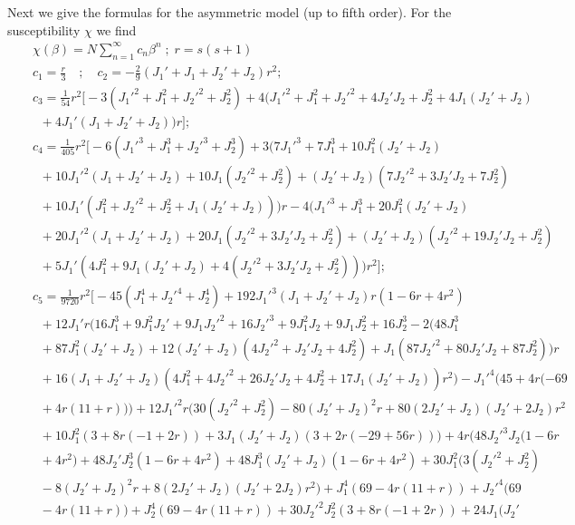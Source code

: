 \documentclass[aps,twocolumn,groupedaddress]{revtex4}
\begin{document}
\begin{widetext}
Next we give the formulas for the asymmetric model
(up to  fifth order).  For the susceptibility $\chi$ we find
\begin{eqnarray}
&& \chi(\beta)=N\sum_{n=1}^{\infty}c_n\beta^n \; ; \; r=s(s+1)\\
&&c_1=\frac{r}{3} \quad ; \quad c_2=-\frac{2}{9}(J_1'+J_1+J_2'+J_2)r^2;\nonumber\\
&&c_3=\frac{1}{54}r^2\Big[-3(J_1'^2+J_1^2+J_2'^2+J_2^2)+4(J_1'^2+J_1^2+J_2'^2+4J_2'J_2+J_2^2+4J_1(J_2'+J_2)\nonumber\\
&& \; \; +4J_1'(J_1+J_2'+J_2))r\Big];\nonumber\\
&&c_4=\frac{1}{405}r^2\Big[-6(J_1'^3+J_1^3+J_2'^3+J_2^3)+3(7J_1'^3+7J_1^3+10J_1^2(J_2'+J_2)\nonumber\\
&& \; \; +10J_1'^2(J_1+J_2'+J_2)+10J_1(J_2'^2+J_2^2)+(J_2'+J_2)(7J_2'^2+3J_2'J_2+7J_2^2)\nonumber\\
&& \; \; +10J_1'(J_1^2+J_2'^2+J_2^2+J_1(J_2'+J_2)))r-4(J_1'^3+J_1^3+20J_1^2(J_2'+J_2)\nonumber\\
&& \; \; +20J_1'^2(J_1+J_2'+J_2)+20J_1(J_2'^2+3J_2'J_2+J_2^2)+(J_2'+J_2)(J_2'^2+19J_2'J_2+J_2^2)\nonumber\\
&& \; \; +5J_1'(4J_1^2+9J_1(J_2'+J_2)+4(J_2'^2+3J_2'J_2+J_2^2)))r^2\Big];\nonumber\\
&&c_5=\frac{1}{9720}r^2\Big[-45(J_1^4+J_2'^4+J_2^4)+192J_1'^3(J_1+J_2'+J_2)r(1-6r+4r^2)\nonumber\\
&& \; \; +12J_1'r(16 J_1^3+9J_1^2J_2'+9J_1J_2'^2+16J_2'^3+9J_1^2J_2+9J_1J_2^2+16J_2^3-2(48J_1^3\nonumber\\
&& \; \; +87J_1^2(J_2'+J_2)+12(J_2'+J_2)(4J_2'^2+J_2'J_2+4J_2^2)+J_1(87J_2'^2+80J_2'J_2+87J_2^2))r\nonumber\\
&& \; \; +16(J_1+J_2'+J_2)(4J_1^2+4J_2'^2+26J_2'J_2+4J_2^2+17J_1(J_2'+J_2))r^2)-J_1'^4(45+4r(-69\nonumber\\
&& \; \; +4r(11+r)))+12J_1'^2r(30(J_2'^2+J_2^2)-80(J_2'+J_2)^2r+80(2J_2'+J_2)(J_2'+2J_2)r^2\nonumber\\
&& \; \; +10J_1^2(3+8r(-1+2 r))+3J_1(J_2'+J_2)(3+2r(-29+56r)))+4r(48J_2'^3J_2(1-6r\nonumber\\
&& \; \; +4r^2)+48J_2'J_2^3(1-6r+4r^2)+48J_1^3(J_2'+J_2)(1-6r+4r^2)+30J_1^2(3(J_2'^2+J_2^2)\nonumber\\
&& \; \; -8(J_2'+J_2)^2r+8(2J_2'+J_2)(J_2'+2J_2)r^2)+J_1^4(69-4r(11+r))+J_2'^4(69\nonumber\\
&& \; \; -4r(11+r))+J_2^4(69-4r(11+r))+30J_2'^2J_2^2(3+8r(-1+2r))+24J_1(J_2'\nonumber\\

\end{eqnarray}
\end{widetext}
\end{document}
